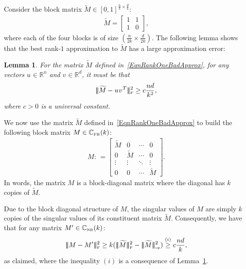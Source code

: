 \documentclass[11pt, hidelinks]{article} %
\newtheorem{lemma}{Lemma}
\newcommand{\matsnorm}[2]{|\!|\!| #1 | \! | \!|_{{#2}}}
\newcommand{\opnorm}[1]{\ensuremath{\matsnorm{#1}{\mbox{\tiny{op}}}}}
\newcommand{\frobnorm}[1]{\ensuremath{\matsnorm{#1}{\mbox{\tiny{F}}}}}
\newcommand{\defn}{\ensuremath{:\,=}}
\newcommand{\reals}{\ensuremath{\mathbb{R}}}
\newcommand{\numrows}{n}
\newcommand{\numcols}{d}
\newcommand{\plaincon}{c}
\newcommand{\wtmatrix}{M}
\newcommand{\wttil}{\widetilde{\wtmatrix}}
\newcommand{\matrixset}{\mathbb{C}}
\newcommand{\nnset}{\matrixset_{\mbox{\tiny NR}}}
\newcommand{\permset}{\matrixset_{\mbox{\tiny PR}}}
\newcommand{\temprank}{k}
\newcommand{\lowLeftVec}[1]{u^{#1}}
\newcommand{\lowRightVec}[1]{v^{#1}}
\begin{document}
Consider the block matrix $\wttil \in
[0,1]^{\frac{\numrows}{\temprank} \times \frac{\numcols}{\temprank}}$:
\begin{align}
\label{EqnRankOneBadApprox}
\wttil = 
\begin{bmatrix}
1 & 1 \\ 1 & 0
\end{bmatrix},
\end{align}
where each of the four blocks is of size $(\frac{\numrows}{2 \temprank}
\times \frac{\numcols}{2 \temprank})$. The following lemma shows that
the best rank-$1$ approximation to $\wttil$ has a large
approximation error:
\begin{lemma}
\label{LemRankOneBadApprox}
For the matrix $\wttil$ defined in~\eqref{EqnRankOneBadApprox}, for
any vectors $\lowLeftVec{} \in \reals^{\numrows}$ and $\lowRightVec{}
\in \reals^{\numcols}$, it must be that
\begin{align*}
\frobnorm{ \wttil - \lowLeftVec{} {\lowRightVec{}}^T }^2 \geq
\plaincon \frac{\numrows \numcols}{\temprank^2},
	\end{align*}
where $\plaincon > 0$ is a universal constant.
\end{lemma}

We now use the matrix $\wttil$ defined in~\eqref{EqnRankOneBadApprox}
to build the following block matrix $\wtmatrix \in
\permset(\temprank)$:
\begin{align*}
\wtmatrix \defn \begin{bmatrix} \wttil & 0 & \cdots & 0 \\ 0 &
  \wttil & \cdots & 0 \\ \vdots & \vdots & \ddots & \vdots \\ 0 & 0
  & \cdots & \wttil
\end{bmatrix}.
\end{align*}
In words, the matrix $\wtmatrix$ is a block-diagonal matrix where the
diagonal has $\temprank$ copies of $\wttil$.

Due to the block diagonal structure of $\wtmatrix$, the singular
values of $\wtmatrix$ are simply $\temprank$ copies of the singular
values of its constituent matrix $\wttil$. Consequently, we have
that for any matrix $\wtmatrix' \in \nnset(\temprank)$:
\begin{align*}
\frobnorm{ \wtmatrix - \wtmatrix'}^2 \geq \temprank (\frobnorm{\wttil}^2
- \opnorm{\wttil}^2) \stackrel{(i)}{\geq} \plaincon \frac{\numrows
  \numcols}{\temprank},
\end{align*} 
as claimed, where the inequality $(i)$ is a consequence of
Lemma~\ref{LemRankOneBadApprox}.
\end{document}
